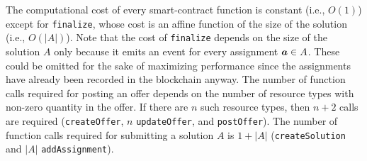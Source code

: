 

The computational cost of every smart-contract function is constant (i.e., $O(1)$) except for \texttt{finalize}, whose cost is an affine function of the size of the solution (i.e., $O(|A|)$).
Note that the cost of \texttt{finalize} depends on the size of the solution $A$ only because it emits an event for every assignment $\boldsymbol{a} \in A$.
These could be omitted for the sake of maximizing performance since the assignments have already been recorded in the blockchain anyway.
The number of function calls required for posting an offer depends on the number of resource types with non-zero quantity in the offer.
If there are $n$ such resource types, then $n + 2$ calls are required (\texttt{createOffer}, $n$ \texttt{updateOffer}, and \texttt{postOffer}).
The number of function calls required for submitting a solution $A$ is $1 + |A|$ (\texttt{createSolution} and $|A|$ \texttt{addAssignment}).


